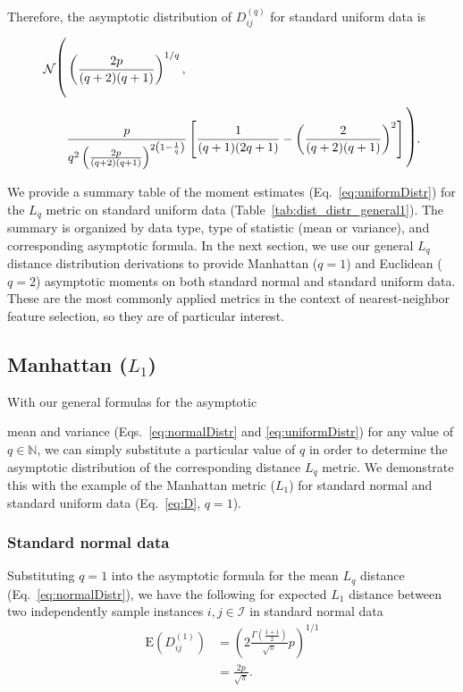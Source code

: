 \documentclass[aoas]{imsart}
\begin{document}
Therefore, the asymptotic distribution of $D^{(q)}_{ij}$ for standard uniform data is
%
\begin{equation}\label{eq:uniformDistr}
\begin{split}
\mathcal{N}{\text{\LARGE $\Biggl($}}& \left(\frac{2p}{(q + 2)(q + 1)}\right)^{1/q}, \\
& \frac{p}{q^2\left(\frac{2p}{(q + 2)(q + 1)}\right)^{2\left(1 - \frac{1}{q}\right)}}\left[\frac{1}{(q + 1)(2q + 1)} - \left(\frac{2}{(q + 2)(q + 1)}\right)^2\right]{\text{\LARGE $\Biggr)$}}.
\end{split}
\end{equation}

We provide a summary table of the moment estimates (Eq.~\ref{eq:uniformDistr}) for the $L_q$ metric on standard uniform data (Table~\ref{tab:dist_distr_general1}). The summary is organized by data type, type of statistic (mean or variance), and corresponding asymptotic formula. In the next section, we use our general $L_q$ distance distribution derivations to provide Manhattan ($q=1$) and Euclidean ($q=2$) asymptotic moments on both standard normal and standard uniform data. These are the most commonly applied metrics in the context of nearest-neighbor feature selection, so they are of particular interest.

\subsection{Manhattan \texorpdfstring{($L_1$)}{}}

With our general formulas for the asymptotic 

\noindent mean and variance (Eqs.~\ref{eq:normalDistr} and \ref{eq:uniformDistr}) for any value of $q \in \mathbb{N}$, we can simply substitute a particular value of $q$ in order to determine the asymptotic distribution of the corresponding distance $L_q$ metric. We demonstrate this with the example of the Manhattan metric ($L_1$) for standard normal and standard uniform data (Eq.~\ref{eq:D}, $q=1$).

\subsubsection{Standard normal data}

Substituting $q=1$ into the asymptotic formula for the mean $L_q$ distance (Eq.~\ref{eq:normalDistr}), we have the following for expected $L_1$ distance between two independently sample instances $i,j \in \mathcal{I}$ in standard normal data
%
\begin{equation}\label{eq:normalManMean}
\begin{aligned}
\text{E}\left(D^{(1)}_{ij}\right) &= \left(2\frac{\Gamma\left(\frac{1 + 1}{2}\right)}{\sqrt{\pi}}p\right)^{1/1} \\
&= \frac{2p}{\sqrt{\pi}}.
\end{aligned}
\end{equation}
\end{document}
